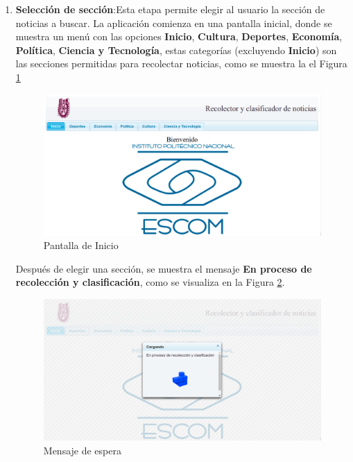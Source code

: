 \begin{enumerate}
  \item \textbf{Selección de sección}:Esta etapa permite elegir al usuario la sección de noticias a buscar. La aplicación comienza en una pantalla inicial, donde se muestra un menú con las opciones \textbf{Inicio}, \textbf{Cultura}, \textbf{Deportes}, \textbf{Economía}, \textbf{Política}, \textbf{Ciencia y Tecnología}, estas categorías (excluyendo \textbf{Inicio}) son las secciones permitidas para recolectar noticias, como se muestra la el Figura \ref{fig:PantallaInicio}

	\begin{figure}[h]
		\centering
		\includegraphics[scale=0.18]{imagenes/Aplicacion/pantallaPrincipal.png}
		\caption{Pantalla de Inicio}
		\label{fig:PantallaInicio}
	\end{figure}

 Después de elegir una sección, se muestra el mensaje \textbf{En proceso de recolección y clasificación}, como se visualiza en la Figura \ref{fig:loading}.

	\begin{figure}[h]
	\centering
	\includegraphics[scale=0.18]{imagenes/Aplicacion/mensajeEspera.png}
	\caption{Mensaje de espera}
	\label{fig:loading}
	\end{figure}



\end{enumerate}
